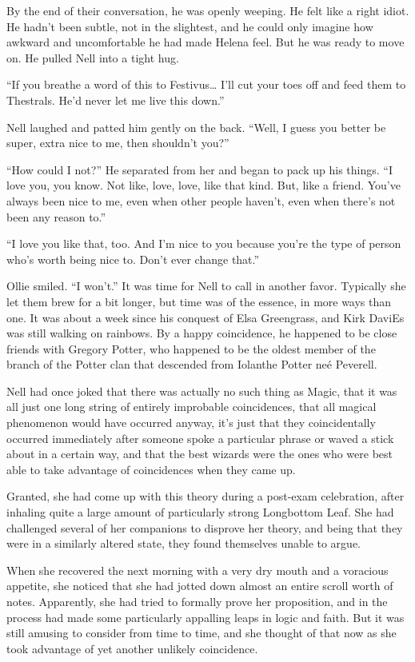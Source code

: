 By the end of their conversation, he was openly weeping. He felt like a right idiot. He hadn’t been subtle, not in the slightest, and he could only imagine how awkward and uncomfortable he had made Helena feel. But he was ready to move on. He pulled Nell into a tight hug.

“If you breathe a word of this to Festivus… I’ll cut your toes off and feed them to Thestrals. He’d never let me live this down.”

Nell laughed and patted him gently on the back. “Well, I guess you better be super, extra nice to me, then shouldn’t you?”

“How could I not?” He separated from her and began to pack up his things. “I love you, you know. Not like, love, love, like that kind. But, like a friend. You’ve always been nice to me, even when other people haven’t, even when there’s not been any reason to.”

“I love you like that, too. And I’m nice to you because you’re the type of person who’s worth being nice to. Don’t ever change that.”

Ollie smiled. “I won’t.”
\simpleline
It was time for Nell to call in another favor. Typically she let them brew for a bit longer, but time was of the essence, in more ways than one. It was about a week since his conquest of Elsa Greengrass, and Kirk DaviEs was still walking on rainbows. By a happy coincidence, he happened to be close friends with Gregory Potter, who happened to be the oldest member of the branch of the Potter clan that descended from Iolanthe Potter neé Peverell.

Nell had once joked that there was actually no such thing as Magic, that it was all just one long string of entirely improbable coincidences, that all magical phenomenon would have occurred anyway, it’s just that they coincidentally occurred immediately after someone spoke a particular phrase or waved a stick about in a certain way, and that the best wizards were the ones who were best able to take advantage of coincidences when they came up.

Granted, she had come up with this theory during a post-exam celebration, after inhaling quite a large amount of particularly strong Longbottom Leaf. She had challenged several of her companions to disprove her theory, and being that they were in a similarly altered state, they found themselves unable to argue.

When she recovered the next morning with a very dry mouth and a voracious appetite, she noticed that she had jotted down almost an entire scroll worth of notes. Apparently, she had tried to formally prove her proposition, and in the process had made some particularly appalling leaps in logic and faith. But it was still amusing to consider from time to time, and she thought of that now as she took advantage of yet another unlikely coincidence.

